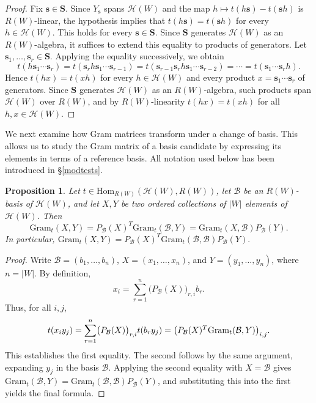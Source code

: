 \documentclass[11pt, reqno]{amsart}
\newcommand{\gram}{\mathrm{Gram}}
\newcommand{\cB}{\mathcal{B}}
\newcommand{\cH}{\mathcal{H}}
\newcommand{\Hom}{\mathrm{Hom}}
\numberwithin{equation}{section}
\newtheorem{proposition}[theorem]{Proposition}
\theoremstyle{remark}
\begin{document}
\begin{proof}
	Fix $\mathbf s\in\mathbf S$. Since $Y_{\mathbf s}$ spans $\cH(W)$ and the map
	$h\mapsto t(h\mathbf s)-t(\mathbf sh)$ is $R(W)$-linear, the hypothesis implies
	that $t(h\mathbf s)=t(\mathbf sh)$ for every $h\in\cH(W)$. This holds for every
	$\mathbf s\in\mathbf S$. Since $\mathbf S$ generates $\cH(W)$ as an
	$R(W)$-algebra, it suffices to extend this equality to products of generators.
	Let $\mathbf s_1,\ldots,\mathbf s_r\in\mathbf S$. Applying the equality
	successively, we obtain
	$$t(h\mathbf s_1\cdots \mathbf s_r)
	=t(\mathbf s_rh\mathbf s_1\cdots \mathbf s_{r-1})
	=t(\mathbf s_{r-1}\mathbf s_rh\mathbf s_1\cdots \mathbf s_{r-2})
	=\cdots
	=t(\mathbf s_1\cdots \mathbf s_rh).$$
	Hence $t(hx)=t(xh)$ for every $h\in\cH(W)$ and every product $x=\mathbf s_1\cdots\mathbf s_r$ of generators. Since $\mathbf S$ generates $\mathcal H(W)$ as an $R(W)$-algebra, such products span $\mathcal H(W)$ over $R(W)$, and by $R(W)$-linearity $t(hx)=t(xh)$ for all $h,x\in\mathcal H(W)$.
\end{proof}
We next examine how Gram matrices transform under a change of basis. This allows us to study the Gram matrix of a basis candidate by expressing its elements in terms of a reference basis. All notation used below has been introduced in \S\ref{modtests}.

\begin{proposition}\label{cbmg}
	Let $t\in\Hom_{R(W)}(\cH(W),R(W))$, let $\cB$ be an $R(W)$-basis of $\cH(W)$, and
	let $X,Y$ be two ordered collections of $|W|$ elements of $\cH(W)$. Then
	\[
	\gram_t(X,Y)=P_{\cB}(X)^T\gram_t(\cB,Y)=\gram_t(X,\cB)P_{\cB}(Y).
	\]
	In particular,
	$\gram_t(X,Y)=P_{\cB}(X)^T\gram_t(\cB,\cB)P_{\cB}(Y).$
\end{proposition}

\begin{proof}
Write $\cB=(b_1,\ldots,b_n)$, $X=(x_1,\ldots,x_n)$, and $Y=(y_1,\ldots,y_n)$, where $n=|W|$. By definition,
\[
x_i=\sum_{r=1}^n \bigl(P_{\cB}(X)\bigr)_{r,i}b_r.
\]
Thus, for all $i,j$,
$$
	t(x_i y_j)
	=\sum_{r=1}^n \bigl(P_{\cB}(X)\bigr)_{r,i}t(b_r y_j)\\
	=\bigl(P_{\cB}(X)^T\gram_t(\cB,Y)\bigr)_{i,j}.
$$
This establishes the first equality. The second follows by the same argument, expanding $y_j$ in the basis $\cB$. Applying the second equality with $X=\mathcal B$ gives $\mathrm{Gram}_t(\mathcal B,Y)=\mathrm{Gram}_t(\mathcal B,\mathcal B)P_{\mathcal B}(Y)$, and substituting this into the first yields the final formula.
\end{proof}
\end{document}
